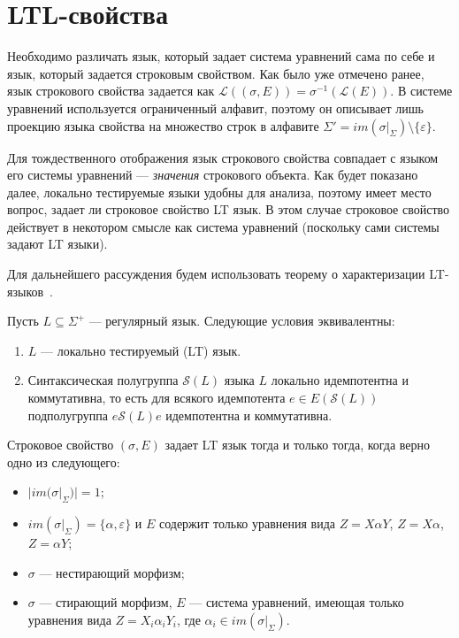 \documentclass[fontsize=14pt]{scrartcl}
\newcommand{\Lang}{\mathcal{L}}
\begin{document}
\section{LTL-свойства}

Необходимо различать язык, который задает система уравнений сама по себе и язык, который задается строковым свойством.
Как было уже отмечено ранее, язык строкового свойства задается как $\Lang((\sigma, E)) = \sigma^{-1}(\Lang(E))$.
В системе уравнений используется ограниченный алфавит, поэтому он описывает лишь проекцию языка свойства на множество 
строк в алфавите $\Sigma' = im(\sigma|_{\Sigma}) \setminus \{\varepsilon\}$.

Для тождественного отображения язык строкового свойства совпадает с языком его системы уравнений --- \textit{значения} строкового объекта.
Как будет показано далее, локально тестируемые языки удобны для анализа, поэтому имеет место вопрос, задает ли строковое свойство LT язык.
В этом случае строковое свойство действует в некотором смысле как система уравнений (поскольку сами системы задают LT языки).

Для дальнейшего рассуждения будем использовать теорему о характеризации LT-языков~\cite{McNaughton1974,BrzozowskiSimon1973,Caron2000}.

\begin{Theorem}
\label{thm:caron-lt}
Пусть $L \subseteq \Sigma^+$ --- регулярный язык. Следующие условия эквивалентны:
\begin{enumerate}
    \item $L$ --- локально тестируемый (LT) язык.
    \item Синтаксическая полугруппа $\mathcal{S}(L)$ языка $L$ локально идемпотентна и коммутативна, то
     есть для всякого идемпотента $e \in E(\mathcal{S}(L))$ подполугруппа $e\mathcal{S}(L)e$ идемпотентна и коммутативна.
\end{enumerate}
\end{Theorem}


\begin{Proposition}
Строковое свойство $(\sigma, E)$ задает LT язык тогда и только тогда, когда верно одно из следующего:
\begin{itemize}
\item $|im(\sigma|_{\Sigma})| = 1$;
\item $im(\sigma|_{\Sigma}) = \{\alpha, \varepsilon\}$ и $E$ содержит только уравнения вида $Z = X \alpha Y$, $Z = X \alpha$, $Z = \alpha Y$;
\item $\sigma$ --- нестирающий морфизм;
\item $\sigma$ --- стирающий морфизм, $E$ --- система уравнений, имеющая только уравнения вида 
$Z = X_i \alpha_i Y_i$, где $\alpha_i \in im(\sigma|_{\Sigma})$.
\end{itemize}
\end{Proposition}
\end{document}
